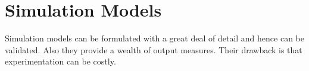 \section{Simulation Models}
Simulation models
can be formulated with a great deal of detail
and hence can be validated.
Also they provide a wealth of output measures.
Their drawback is that experimentation can be costly.
